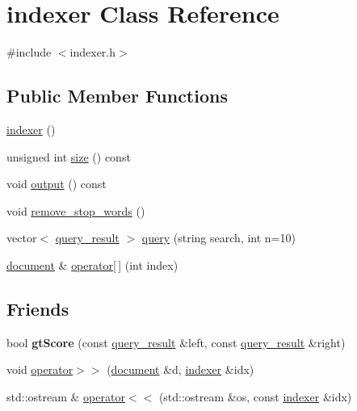 \hypertarget{classindexer}{}\section{indexer Class Reference}
\label{classindexer}


{\ttfamily \#include $<$indexer.\+h$>$}

\subsection*{Public Member Functions}
\begin{DoxyCompactItemize}
\item 
\hyperlink{classindexer_acbbcbad080a7ae43ed78840fcf006960}{indexer} ()
\item 
unsigned int \hyperlink{classindexer_a227b90870b8807668485754e402b8a60}{size} () const
\item 
void \hyperlink{classindexer_af84f1ddc60859b7d007699ee011abf36}{output} () const
\item 
void \hyperlink{classindexer_afdaec83c53cbc4df71436a4c936a2e89}{remove\+\_\+stop\+\_\+words} ()
\item 
vector$<$ \hyperlink{classquery__result}{query\+\_\+result} $>$ \hyperlink{classindexer_ae72394af5bf9eb84cf2b245f19d8cf27}{query} (string search, int n=10)
\item 
\hyperlink{classdocument}{document} \& \hyperlink{classindexer_a1ef6a5497d341fdbbae13bb26a66c37a}{operator\mbox{[}$\,$\mbox{]}} (int index)
\end{DoxyCompactItemize}
\subsection*{Friends}
\begin{DoxyCompactItemize}
\item 
\mbox{\label{classindexer_af90a86217251694caa9471be14515ee9}} 
bool {\bfseries gt\+Score} (const \hyperlink{classquery__result}{query\+\_\+result} \&left, const \hyperlink{classquery__result}{query\+\_\+result} \&right)
\item 
void \hyperlink{classindexer_a0fe0af7a5ec91ffbe15a2a89d11fe038}{operator$>$$>$} (\hyperlink{classdocument}{document} \&d, \hyperlink{classindexer}{indexer} \&idx)
\item 
std\+::ostream \& \hyperlink{classindexer_afbe836c0f0a47dc1393416275175fadb}{operator$<$$<$} (std\+::ostream \&os, const \hyperlink{classindexer}{indexer} \&idx)
\end{DoxyCompactItemize}


